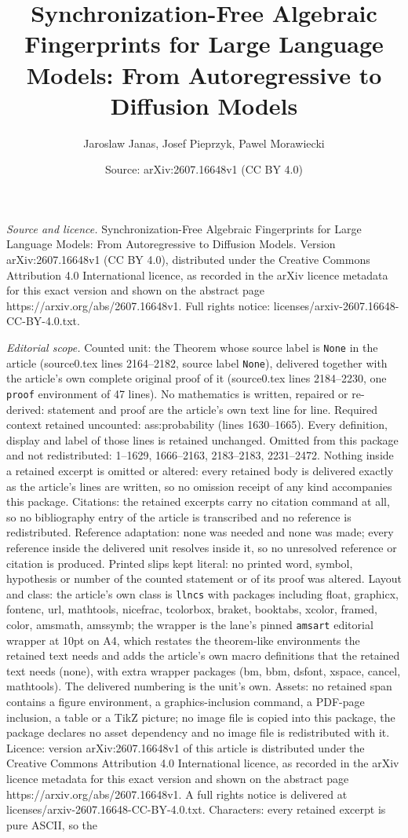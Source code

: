 \documentclass[10pt,a4paper]{amsart}
\title[Synchronization-Free Algebraic Fingerprints for Large Langua]{Synchronization-Free Algebraic Fingerprints for Large Language Models: From Autoregressive to Diffusion Models}
\author{Jaroslaw Janas, Josef Pieprzyk, Pawel Morawiecki}
\date{Source: arXiv:2607.16648v1 (CC BY 4.0)}
\begin{document}
\maketitle

\noindent\emph{Source and licence.} Synchronization-Free Algebraic Fingerprints for Large Language Models: From Autoregressive to Diffusion Models. Version arXiv:2607.16648v1 (CC BY 4.0), distributed under the Creative Commons Attribution 4.0 International licence, as recorded in the arXiv licence metadata for this exact version and shown on the abstract page https://arxiv.org/abs/2607.16648v1. Full rights notice: licenses/arxiv-2607.16648-CC-BY-4.0.txt.\par\smallskip

\noindent\textit{Editorial scope.} Counted unit: the Theorem whose source label is \texttt{None} in the article (source0.tex lines 2164--2182, source label \texttt{None}), delivered together with the article's own complete original proof of it (source0.tex lines 2184--2230, one \texttt{proof} environment of 47 lines). No mathematics is written, repaired or re-derived: statement and proof are the article's own text line for line. Required context retained uncounted: ass:probability (lines 1630--1665). Every definition, display and label of those lines is retained unchanged. Omitted from this package and not redistributed: 1--1629, 1666--2163, 2183--2183, 2231--2472. Nothing inside a retained excerpt is omitted or altered: every retained body is delivered exactly as the article's lines are written, so no omission receipt of any kind accompanies this package. Citations: the retained excerpts carry no citation command at all, so no bibliography entry of the article is transcribed and no reference is redistributed. Reference adaptation: none was needed and none was made; every reference inside the delivered unit resolves inside it, so no unresolved reference or citation is produced. Printed slips kept literal: no printed word, symbol, hypothesis or number of the counted statement or of its proof was altered. Layout and class: the article's own class is \texttt{llncs} with packages including float, graphicx, fontenc, url, mathtools, nicefrac, tcolorbox, braket, booktabs, xcolor, framed, color, amsmath, amssymb; the wrapper is the lane's pinned \texttt{amsart} editorial wrapper at 10pt on A4, which restates the theorem-like environments the retained text needs and adds the article's own macro definitions that the retained text needs (none), with extra wrapper packages (bm, bbm, dsfont, xspace, cancel, mathtools). The delivered numbering is the unit's own. Assets: no retained span contains a figure environment, a graphics-inclusion command, a PDF-page inclusion, a table or a TikZ picture; no image file is copied into this package, the package declares no asset dependency and no image file is redistributed with it. Licence: version arXiv:2607.16648v1 of this article is distributed under the Creative Commons Attribution 4.0 International licence, as recorded in the arXiv licence metadata for this exact version and shown on the abstract page https://arxiv.org/abs/2607.16648v1. A full rights notice is delivered at licenses/arxiv-2607.16648-CC-BY-4.0.txt. Characters: every retained excerpt is pure ASCII, so the 
\end{document}
